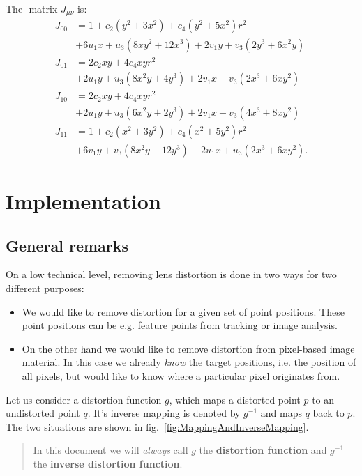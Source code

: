 \documentclass[10pt,a4paper]{article}
\begin{document}
The \Jacobi-matrix $J_{\mu\nu}$ is:
\begin{align}
J_{00}	&= 1 + c_2 (y^2 + 3x^2) + c_4 (y^2 + 5x^2) r^2 \nonumber\\
	&+ 6 u_1 x + u_3 (8 x y^2 + 12 x^3)
	+ 2 v_1 y + v_3 (2 y^3 + 6 x^2 y) \nonumber\\
J_{01}	&= 2 c_2 xy + 4 c_4 xy r^2 \nonumber\\
	&+ 2 u_1 y + u_3 (8 x^2 y + 4 y^3)
	+ 2 v_1 x + v_3 (2 x^3 + 6 x y^2)\nonumber\\
J_{10}	&= 2 c_2 xy + 4 c_4 xy r^2 \nonumber\\
	&+ 2 u_1 y + u_3 (6 x^2 y + 2 y^3)
	+ 2 v_1 x + v_3 (4 x^3 + 8 x y^2) \nonumber\\
J_{11}	&= 1 + c_2 (x^2+3y^2) + c_4 (x^2 + 5y^2) r^2 \nonumber\\
	&+ 6 v_1 y + v_3 (8 x^2 y + 12 y^3)
	+ 2 u_1 x + u_3 (2 x^3 + 6 x y^2).
\end{align}


\section{Implementation}
\label{Implementation}
\subsection{General remarks}

On a low technical level, removing lens distortion is done in two ways
for two different purposes:
\begin{itemize}
\item We would like to remove distortion for a given set of point positions.
These point positions can be e.g. feature points from tracking or image analysis.
\item On the other hand we would like to remove distortion from
pixel-based image material. In this case we already {\em know} the target
positions, i.e. the position of all pixels, but would like to know where
a particular pixel originates from.
\end{itemize}
Let us consider a distortion function $g$, which maps a distorted point $p$
to an undistorted point $q$. It's inverse mapping is denoted by $g^{-1}$ and maps
$q$ back to $p$. The two situations are shown in fig.~\ref{fig:MappingAndInverseMapping}.

\begin{quote}
In this document we will {\em always} call $g$ the {\bf distortion function}
and $g^{-1}$ the {\bf inverse distortion function}.
\end{quote}
\end{document}
